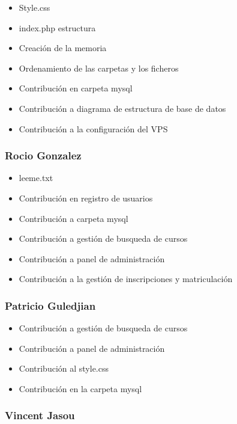 \documentclass[
]{article}
\providecommand{\tightlist}{%
  \setlength{\itemsep}{0pt}\setlength{\parskip}{0pt}}
\begin{document}
\begin{itemize}
\tightlist
\item
  Style.css
\item
  index.php estructura
\item
  Creación de la memoria
\item
  Ordenamiento de las carpetas y los ficheros
\item
  Contribución en carpeta mysql
\item
  Contribución a diagrama de estructura de base de datos
\item
  Contribución a la configuración del VPS
\end{itemize}

\subsubsection{Rocio Gonzalez}\label{rocio-gonzalez}

\begin{itemize}
\tightlist
\item
  leeme.txt
\item
  Contribución en registro de usuarios
\item
  Contribución a carpeta mysql
\item
  Contribución a gestión de busqueda de cursos
\item
  Contribución a panel de administración
\item
  Contribución a la gestión de inscripciones y matriculación
\end{itemize}

\subsubsection{Patricio Guledjian}\label{patricio-guledjian}

\begin{itemize}
\tightlist
\item
  Contribución a gestión de busqueda de cursos
\item
  Contribución a panel de administración
\item
  Contribución al style.css
\item
  Contribución en la carpeta mysql
\end{itemize}

\subsubsection{Vincent Jasou}\label{vincent-jasou}
\end{document}
